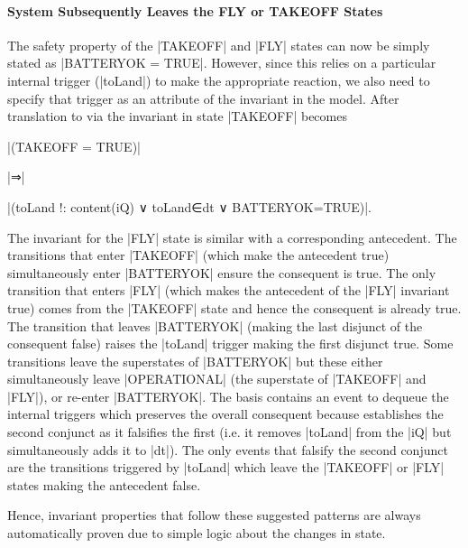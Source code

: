 \paragraph{System Subsequently Leaves the FLY or TAKEOFF States}
The safety property of the |TAKEOFF| and |FLY| states can now be simply stated as |BATTERYOK = TRUE|. 
However, since this relies on a particular internal trigger (|toLand|) to make the appropriate reaction, we also need to specify that trigger as an attribute of the invariant in the \SCXML model.
After translation to \EVENTB via \UMLB the invariant in state |TAKEOFF| becomes 

\begin{center}
  |(TAKEOFF = TRUE)|

  |⇒|

  |(toLand !: content(iQ) ∨ toLand∈dt ∨ BATTERYOK=TRUE)|.
\end{center}

The invariant for the |FLY| state is similar with a corresponding antecedent.
The transitions that enter |TAKEOFF| (which make the antecedent true) simultaneously enter |BATTERYOK| ensure the consequent is true.
The only transition that enters |FLY| (which makes the antecedent of the |FLY| invariant true) comes from the |TAKEOFF| state and hence the consequent is already true.
The transition that leaves |BATTERYOK| (making the last disjunct of the consequent false) raises the |toLand| trigger making the first disjunct true.
Some transitions leave the superstates of |BATTERYOK| but these either simultaneously leave |OPERATIONAL| (the superstate of |TAKEOFF| and |FLY|), or re-enter |BATTERYOK|.
The basis contains an event to dequeue the internal triggers which preserves the overall consequent because establishes the second conjunct as it falsifies the first (i.e. it removes |toLand| from the |iQ| but simultaneously adds it to |dt|).
The only events that falsify the second conjunct are the transitions triggered by |toLand| which leave the |TAKEOFF| or |FLY| states making the antecedent false.

Hence, invariant properties that follow these suggested patterns are always automatically proven due to simple logic about the changes in state.

